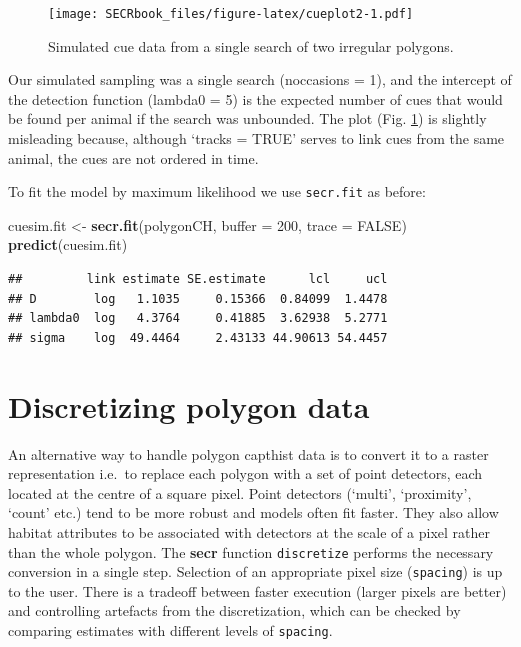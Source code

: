 \documentclass[
]{book}
\newenvironment{Shaded}{\begin{snugshade}}{\end{snugshade}}
\newcommand{\AttributeTok}[1]{\textcolor[rgb]{0.13,0.29,0.53}{#1}}
\newcommand{\ConstantTok}[1]{\textcolor[rgb]{0.56,0.35,0.01}{#1}}
\newcommand{\DecValTok}[1]{\textcolor[rgb]{0.00,0.00,0.81}{#1}}
\newcommand{\FunctionTok}[1]{\textcolor[rgb]{0.13,0.29,0.53}{\textbf{#1}}}
\newcommand{\NormalTok}[1]{#1}
\newcommand{\OtherTok}[1]{\textcolor[rgb]{0.56,0.35,0.01}{#1}}
\begin{document}
\begin{figure}
\centering
\texttt{[image: SECRbook\_files/figure-latex/cueplot2-1.pdf]}
\caption{\label{fig:cueplot2}Simulated cue data from a single search of two irregular polygons.}
\end{figure}

Our simulated sampling was a single search (noccasions = 1), and the intercept of the detection function (lambda0 = 5) is the expected number of cues that would be found per animal if the search was unbounded. The plot (Fig. \ref{fig:cueplot2}) is slightly misleading because, although `tracks = TRUE' serves to link cues from the same animal, the cues are not ordered in time.

To fit the model by maximum likelihood we use \texttt{secr.fit} as before:

\begin{Shaded}
\begin{Highlighting}[]
\NormalTok{cuesim.fit }\OtherTok{\textless{}{-}} \FunctionTok{secr.fit}\NormalTok{(polygonCH, }\AttributeTok{buffer =} \DecValTok{200}\NormalTok{, }\AttributeTok{trace =} \ConstantTok{FALSE}\NormalTok{)}
\FunctionTok{predict}\NormalTok{(cuesim.fit)}
\end{Highlighting}
\end{Shaded}

\begin{verbatim}
##         link estimate SE.estimate      lcl     ucl
## D        log   1.1035     0.15366  0.84099  1.4478
## lambda0  log   4.3764     0.41885  3.62938  5.2771
## sigma    log  49.4464     2.43133 44.90613 54.4457
\end{verbatim}

\section{Discretizing polygon data}\label{discretize}

An alternative way to handle polygon capthist data is to convert it to a raster representation i.e.~to replace each polygon with a set of point detectors, each located at the centre of a square pixel. Point detectors (`multi', `proximity', `count' etc.) tend to be more robust and models often fit faster. They also allow habitat attributes to be associated with detectors at the scale of a pixel rather than the whole polygon. The \textbf{secr} function \texttt{discretize} performs the necessary conversion in a single step. Selection of an appropriate pixel size (\texttt{spacing}) is up to the user. There is a tradeoff between faster execution (larger pixels are better) and controlling artefacts from the discretization, which can be checked by comparing estimates with different levels of \texttt{spacing}.
\end{document}
